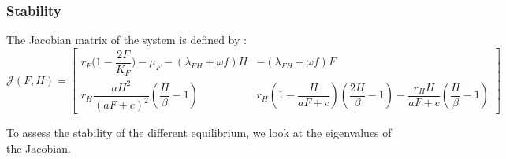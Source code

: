 \documentclass{article}
\newcommand{\lf}{\lambda_{FH}}
\begin{document}
\subsubsection{Stability}
The Jacobian matrix of the system is defined by :
\begin{equation}
\mathcal{J}(F,H) =  \begin{bmatrix}
r_F \Big(1-\dfrac{2F}{K_F} \Big) - \mu_F - (\lf + \omega f)H & -(\lf + \omega f)F \\
r_H \dfrac{aH^2}{(aF+c)^2} (\dfrac{H}{\beta}-1) & r_H(1-\dfrac{H}{aF+c})(\dfrac{2H}{\beta}-1) - \dfrac{r_H H}{aF+c}(\dfrac{H}{\beta}-1)
\end{bmatrix}
\label{stab:jacobianFH}
\end{equation}

To assess the stability of the different equilibrium, we look at the eigenvalues of the Jacobian.
\end{document}
